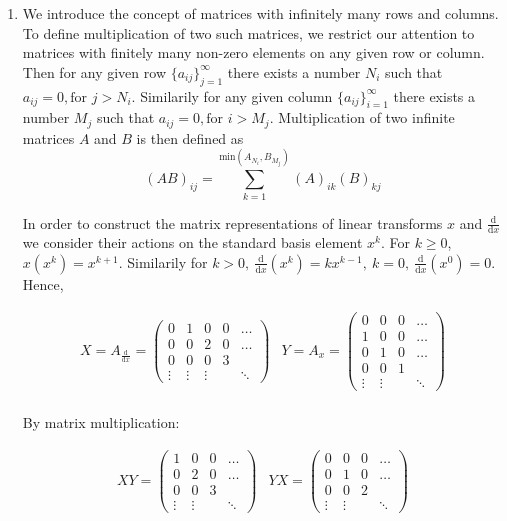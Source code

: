 \documentclass[11pt]{amsart}
\newcommand{\ud}{\mathrm{d}}
\begin{document}
\begin{enumerate}
\item We introduce the concept of matrices with infinitely many rows
  and columns. To define multiplication of two such matrices, we
  restrict our attention to matrices with finitely many non-zero
  elements on any given row or column. Then for any given row
  $\{a_{ij}\}_{j=1}^\infty$ there exists a number $N_i$ such that
  $a_{ij}=0,\textrm{for } j>N_i$. Similarily for any given column
  $\{a_{ij}\}_{i=1}^\infty$ there exists a number $M_j$ such that
  $a_{ij}=0,\textrm{for } i>M_j$. Multiplication of two infinite
  matrices $A$ and $B$ is then defined as $$(AB)_{ij} =
  \sum_{k=1}^{\textrm{min}(A_{N_i}, B_{M_j})} (A)_{ik}(B)_{kj}$$
  
  In order to construct the matrix representations of linear
  transforms $x$ and $\frac{\ud}{\ud x}$ we consider their actions on
  the standard basis element $x^k$. For $k \geq 0$, $x(x^k)=x^{k+1}$.
  Similarily for $k>0,\ \frac{\ud}{\ud x}(x^k)=kx^{k-1}, \ k=0, \ 
  \frac{\ud}{\ud x}(x^0)=0$. Hence,

$$
\begin{array}{rr}
X=A_{\frac{\ud}{\ud x}}= \left( \begin{array}{ccccc}
            0 & 1 & 0 & 0 & \ldots \\
            0 & 0 & 2 & 0 & \ldots   \\
            0 & 0 & 0 & 3 & \\
            \vdots & \vdots & \vdots & & \ddots
            \end{array} \right)&

Y=A_x = \left( \begin{array}{cccc}
            0 & 0 & 0 & \ldots \\
            1 & 0 & 0 & \ldots   \\
            0 & 1 & 0 & \ldots \\
            0 & 0 & 1 &  \\
            \vdots & \vdots & & \ddots
            \end{array} \right) 
\end{array}$$\\
By matrix multiplication:

$$
\begin{array}{cc}
XY = \left( \begin{array}{cccc}
            1 & 0 & 0 & \ldots \\
            0 & 2 & 0 & \ldots   \\
            0 & 0 & 3 &  \\
            \vdots & \vdots & & \ddots
            \end{array} \right) & 
YX = \left( \begin{array}{cccc}
            0 & 0 & 0 & \ldots \\
            0 & 1 & 0 & \ldots   \\
            0 & 0 & 2 &  \\
            \vdots & \vdots & & \ddots 
            \end{array} \right)
\end{array}$$\\


\end{enumerate}
\end{document}
